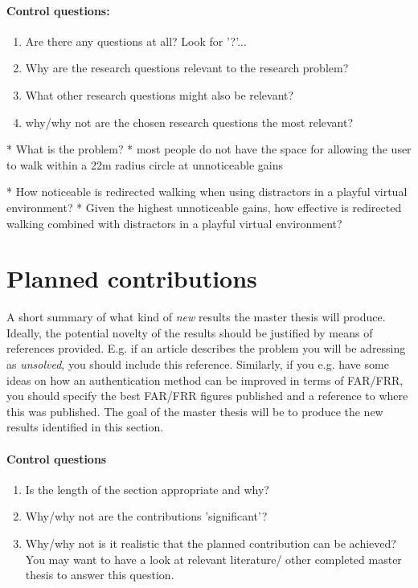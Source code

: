 \paragraph{Control questions:}
\begin{enumerate}
\item Are there any questions at all? Look for '?'...
\item Why are the research questions relevant to the research problem?
\item What other research questions might also be relevant?
\item why/why not are the chosen research questions the most relevant?
\end{enumerate}

* What is the problem?
   * most people do not have the space for allowing the user to walk within a 22m radius circle at unnoticeable gains

* How noticeable is redirected walking when using distractors in a playful virtual environment?
* Given the highest unnoticeable gains, how effective is redirected walking combined with distractors in a playful virtual environment?

\section{Planned contributions}
A short summary of what kind of {\em new} results the master thesis will produce.  
Ideally,  the potential novelty of the results should be justified by means of references provided.
E.g. if an article describes the problem you will be adressing as {\em unsolved},
you should include this reference.  Similarly, if you e.g. have some ideas on how an 
authentication method can be improved in terms of FAR/FRR, you should specify the best
 FAR/FRR figures published and a reference to where this was published. 
 The goal of the master thesis
will be to produce the new results identified in this section.

\paragraph{Control questions}
\begin{enumerate}
\item Is the length of the section appropriate and why?
\item Why/why not are the contributions 'significant'?
\item Why/why not is it realistic that the planned contribution can be achieved?  You may want to have a look at relevant literature/ other completed master thesis to answer this question.
\end{enumerate}